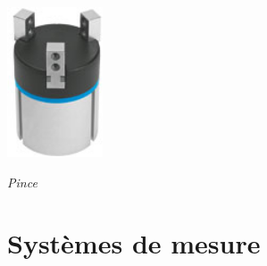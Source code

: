 \documentclass[10pt]{article}
\begin{document}
\begin{minipage}[c]{.3\linewidth}
\begin{center}
\includegraphics[width=.5\textwidth]{images/pince_festo}

\textit{Pince}
\end{center}
\end{minipage}
\section{Systèmes de mesure}
\end{document}
